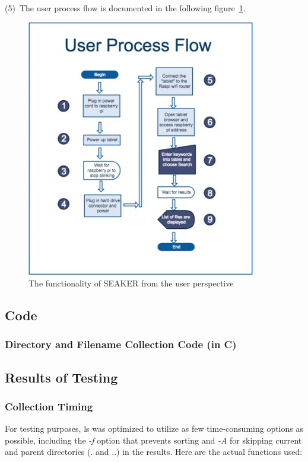 \documentclass[12pt]{article}
\begin{document}
(5)~The user process flow is documented in the following
figure~\ref{fig:user_process_flow}.

\begin{figure}[ht]
  \begin{center}
  \includegraphics[width=10cm]{images/user_process_flow.jpg}
  \caption{The functionality of SEAKER from the user perspective}
  \label{fig:user_process_flow}
  \end{center}
\end{figure}

\newpage
\subsection{Code}
\subsubsection{Directory and Filename Collection Code (in C)}


\newpage
\subsection{Results of Testing}
\subsubsection{Collection Timing}

For testing purposes, ls was optimized to utilize as few time-consuming
options as possible, including the {\em -f} option that prevents sorting
and {\em -A} for skipping current and parent directories (. and ..)
in the results.
Here are the actual functions used:
\end{document}
